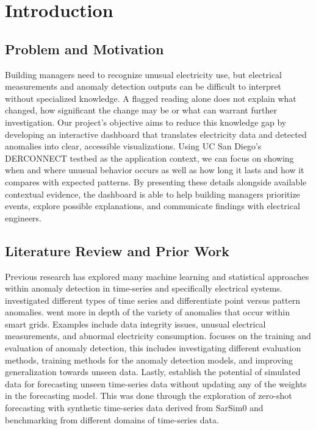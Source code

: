 \documentclass[12pt,letterpaper]{article}
\begin{document}
\maketoc
\clearpage


\section{Introduction}

\subsection{Problem and Motivation}

Building managers need to recognize unusual electricity use, but electrical measurements and anomaly detection outputs can be difficult to interpret without specialized knowledge. A flagged reading alone does not explain what changed, how significant the change may be or what can warrant further investigation. Our project's objective aims to reduce this knowledge gap by developing an interactive dashboard that translates electricity data and detected anomalies into clear, accessible visualizations. Using UC San Diego's DERCONNECT testbed as the application context, we can focus on showing when and where unusual behavior occurs as well as how long it lasts and how it compares with expected patterns. By presenting these details alongside available contextual evidence, the dashboard is able to help building managers prioritize events, explore possible explanations, and communicate findings with electrical engineers.

\subsection{Literature Review and Prior Work}

Previous research has explored many machine learning and statistical approaches within anomaly detection in time-series and specifically electrical systems. \citet{lai2021revisiting} investigated different types of time series and differentiate point versus pattern anomalies. \citet{guatoburgos2024review} went more in depth of the variety of anomalies that occur within smart grids. Examples include data integrity issues, unusual electrical measurements, and abnormal electricity consumption. \citet{si2024timeseriesbench} focuses on the training and evaluation of anomaly detection, this includes investigating different evaluation methods, training methods for the anomaly detection models, and improving generalization towards unseen data. Lastly, \citet{oreshkin2026zeroshot} establish the potential of simulated data for forecasting unseen time-series data without updating any of the weights in the forecasting model. This was done through the exploration of zero-shot forecasting with synthetic time-series data derived from SarSim0 and benchmarking from different domains of time-series data.
\end{document}
